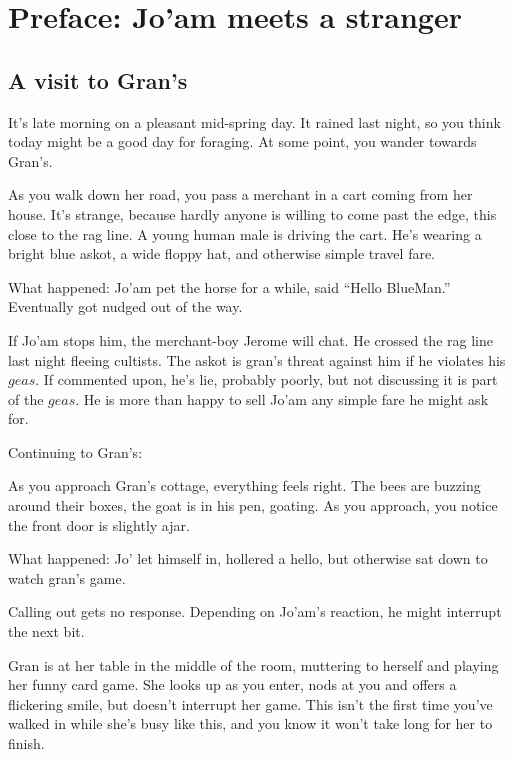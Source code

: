 \section{Preface: Jo'am meets a stranger}\label{sec:joamMeetsAStranger}

\begin{multicols}{2}
  \subsection{A visit to Gran's}
  \begin{aloud}
  It's late morning on a pleasant mid-spring day.
  It rained last night, so you think today might be a good day for foraging.
  At some point, you wander towards Gran's.

  As you walk down her road, you pass a merchant in a cart coming from her house.
  It's strange, because hardly anyone is willing to come past the edge, this close to the rag line.
  A young human male is driving the cart.
  He's wearing a bright blue askot, a wide floppy hat, and otherwise simple travel fare.

  What happened: Jo'am pet the horse for a while, said ``Hello BlueMan.''
  Eventually got nudged out of the way.
  \end{aloud}

If Jo'am stops him, the merchant-boy Jerome will chat.
He crossed the rag line last night fleeing cultists.
The askot is gran's threat against him if he violates his $geas$.
If commented upon, he's lie, probably poorly, but not discussing it is part of the $geas$.
He is more than happy to sell Jo'am any simple fare he might ask for.


Continuing to Gran's:

  \begin{aloud}
  As you approach Gran's cottage, everything feels right.
  The bees are buzzing around their boxes, the goat is in his pen, goating.
  As you approach, you notice the front door is slightly ajar.

  What happened: Jo' let himself in, hollered a hello, but otherwise sat down to watch gran's game.
  \end{aloud}

Calling out gets no response.
Depending on Jo'am's reaction, he might interrupt the next bit.

  \begin{aloud}
  Gran is at her table in the middle of the room, muttering to herself and playing her
    funny card game.
  She looks up as you enter, nods at you and offers a flickering smile, but doesn't interrupt
    her game.
  This isn't the first time you've walked in while she's busy like this, and you know it won't
    take long for her to finish.


\end{aloud}
\end{multicols}
